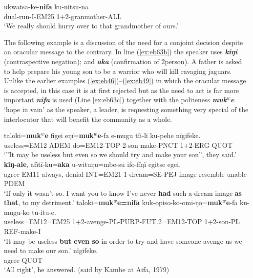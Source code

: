 \documentclass[output=paper]{langsci/langscibook}
\begin{document}
\begin{exe}
	\ex \label{ex:eb62}
	\gll ukwatsa-ke-\textbf{nifa} ku-nitsu-na\\ 
	dual-run-I-EM25 1+2-granmother-ALL\\
	\trans ‘We really should hurry over to that grandmother of ours.’
\end{exe}

The following example is a discussion of the need for a conjoint decision despite an oracular message to the contrary. In line (\ref{ex:eb63b}) the speaker uses \textbf{\textit{kiŋi}} (contraspective negation); and \textbf{\textit{aka}} (confirmation of 2person).  A father is asked to help prepare his young son  to be a warrior who will kill ravaging jaguars.  Unlike the earlier examples (\ref{ex:eb46})--(\ref{ex:eb49}) in which the oracular message is accepted, in this case it is at first rejected but as the need to act is far more important  \textbf{\textit{nifa}} is used (Line \ref{ex:eb63c}) together with the politeness  \textbf{\textit{muk$^w$e}} ‘hope in vain’ as the speaker, a leader,  is requesting something very special of the interlocutor that will benefit the community as a whole. 

\begin{exe}
\ex \label{ex:eb63}
	\begin{xlist}
	\ex \label{ex:eb63a}
	\gll taloki=\textbf{muk$^w$e} figei eŋï=\textbf{muk$^w$e}-fa e-mugu tïi-lï ku-pehe nïgifeke.\\
	useless=EM12 ADEM do=EM12-TOP 2-son make-PNCT 1+2-ERG QUOT\\
	\trans ‘”It may be useless but even so we should try and make your son”, they said.’
	\ex \label{ex:eb63b}
	 \textbf{kiŋ-ale}, afïtï-ku=\textbf{aka} u-wituŋu=mbe-su ifo-fïŋï egitse egei.\\
	agree-EM11-always, denial-INT=EM21 1-dream=SE-PEJ image-resemble unable PDEM\\
	\trans ‘If only it wasn’t so.  I want you to know I’ve never \textbf{had} such a dream image \textbf{as that}, to my detriment.’
	\ex \label{ex:eb63c}
	\gll taloki=\textbf{muk$^w$e=nifa} kuk-opiso-ko-omi-ŋo=\textbf{muk$^w$e}-fa ku-mugu-ko tu-itu-e.\\
	useless=EM12=EM25 1+2-avenge-PL-PURP-FUT.2=EM12-TOP 1+2-son-PL REF-make-I\\
	\trans ‘It may be useless \textbf{but even so} in order to try and have someone avenge us we need to make our son.’
	\ex \label{ex:eb63d}
	 nïgifeke.\\
	agree QUOT\\
	\trans ‘All right’, he answered. (said by Kambe at Aifa, 1979)
\end{xlist}
\end{exe}
\end{document}
